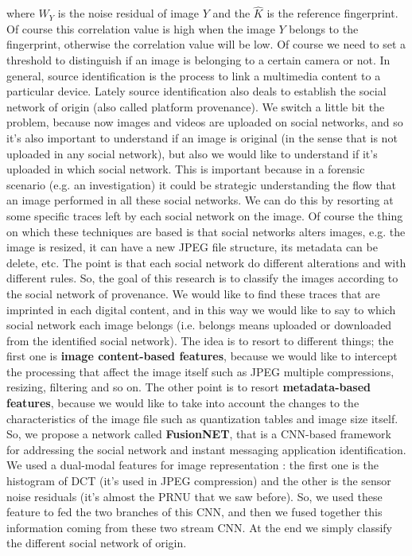 \documentclass[11pt]{article}
\begin{document}
where $W_{Y}$ is the noise residual of image $Y$ and the $\hat{K}$ is the reference fingerprint. Of course this correlation value is high when the image $Y$ belongs to the fingerprint, otherwise the correlation value will be low. Of course we need to set a threshold to distinguish if an image is belonging to a certain camera or not. In general, source identification is the process to link a multimedia content to a particular device. Lately source identification also deals to establish the social network of origin (also called platform provenance). We switch a little bit the problem, because now images and videos are uploaded on social networks, and so it's also important to understand if an image is original (in the sense that is not uploaded in any social network), but also we would like to understand if it's uploaded in which social network. This is important because in a forensic scenario (e.g. an investigation) it could be strategic understanding the flow that an image performed in all these social networks. We can do this by resorting at some specific traces left by each social network on the image. Of course the thing on which these techniques are based is that social networks alters images, e.g. the image is resized, it can have a new JPEG file structure, its metadata can be delete, etc. The point is that each social network do different alterations and with different rules. So, the goal of this research is to classify the images according to the social network of provenance. We would like to find these traces that are imprinted in each digital content, and in this way we would like to say to which social network each image belongs (i.e. belongs means uploaded or downloaded from the identified social network). The idea is to resort to different things; the first one is \textbf{image content-based features}, because we would like to intercept the processing that affect the image itself such as JPEG multiple compressions, resizing, filtering and so on. The other point is to resort \textbf{metadata-based features}, because we would like to take into account the changes to the characteristics of the image file such as quantization tables and image size itself. So, we propose a network called \textbf{FusionNET}, that is a CNN-based framework for addressing the social network and instant messaging application identification. We used a dual-modal features for image representation : the first one is the histogram of DCT (it's used in JPEG compression) and the other is the sensor noise residuals (it's almost the PRNU that we saw before). So, we used these feature to fed the two branches of this CNN, and then we fused together this information coming from these two stream CNN. At the end we simply classify the different social network of origin.
\end{document}
